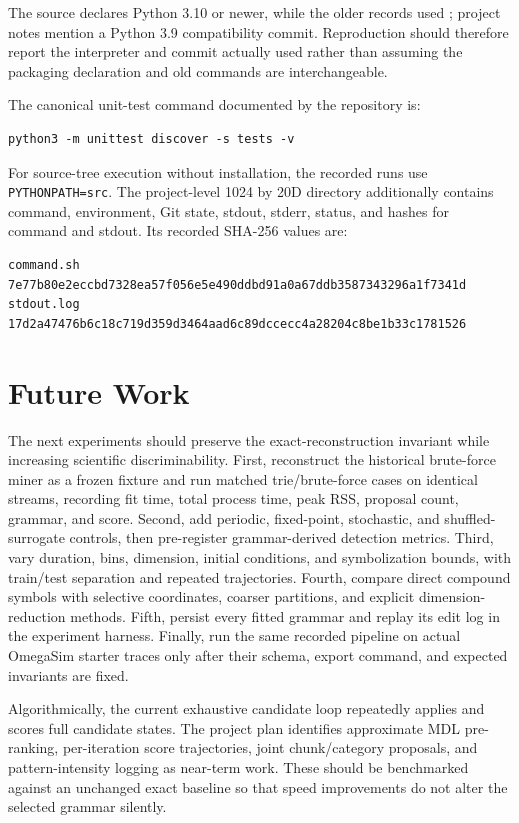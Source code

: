 \documentclass[11pt]{article}
\begin{document}
The source declares Python 3.10 or newer, while the older records used
; project notes mention a Python 3.9
compatibility commit. Reproduction should therefore report the interpreter and
commit actually used rather than assuming the packaging declaration and old
commands are interchangeable.

The canonical unit-test command documented by the repository is:

\begin{lstlisting}
python3 -m unittest discover -s tests -v
\end{lstlisting}

For source-tree execution without installation, the recorded runs use
\texttt{PYTHONPATH=src}. The project-level 1024 by 20D directory additionally
contains command, environment, Git state, stdout, stderr, status, and hashes for
command and stdout. Its recorded SHA-256 values are:
\begin{lstlisting}
command.sh  7e77b80e2eccbd7328ea57f056e5e490ddbd91a0a67ddb3587343296a1f7341d
stdout.log  17d2a47476b6c18c719d359d3464aad6c89dccecc4a28204c8be1b33c1781526
\end{lstlisting}

\section{Future Work}

The next experiments should preserve the exact-reconstruction invariant while
increasing scientific discriminability. First, reconstruct the historical
brute-force miner as a frozen fixture and run matched trie/brute-force cases on
identical streams, recording fit time, total process time, peak RSS, proposal
count, grammar, and score. Second, add periodic, fixed-point, stochastic, and
shuffled-surrogate controls, then pre-register grammar-derived detection
metrics. Third, vary duration, bins, dimension, initial conditions, and
symbolization bounds, with train/test separation and repeated trajectories.
Fourth, compare direct compound symbols with selective coordinates, coarser
partitions, and explicit dimension-reduction methods. Fifth, persist every
fitted grammar and replay its edit log in the experiment harness. Finally, run
the same recorded pipeline on actual OmegaSim starter traces only after their
schema, export command, and expected invariants are fixed.

Algorithmically, the current exhaustive candidate loop repeatedly applies and
scores full candidate states. The project plan identifies approximate MDL
pre-ranking, per-iteration score trajectories, joint chunk/category proposals,
and pattern-intensity logging as near-term work. These should be benchmarked
against an unchanged exact baseline so that speed improvements do not alter the
selected grammar silently.
\end{document}
